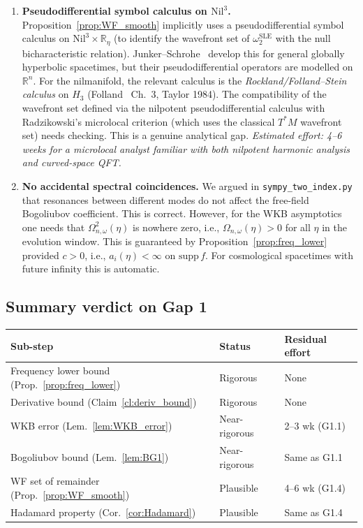 \documentclass[11pt, a4paper]{article}
\newcommand{\RR}{\mathbb{R}}
\newcommand{\Nil}{\mathrm{Nil}^3}
\newcommand{\om}{\omega}
\begin{document}
\begin{enumerate}[label=G1.\arabic*]
\item \label{gap:pseudodiff_nilmanifold}
  \textbf{Pseudodifferential symbol calculus on $\Nil$.}
  Proposition~\ref{prop:WF_smooth} implicitly uses a pseudodifferential
  symbol calculus on $\Nil \times \RR_\eta$ (to identify the
  wavefront set of $\omega_2^{\mathrm{SLE}}$ with the null bicharacteristic
  relation).
  Junker--Schrohe~\cite{JS02} develop this for general globally hyperbolic
  spacetimes, but their pseudodifferential operators are modelled on
  $\RR^n$.
  For the nilmanifold, the relevant calculus is the
  \emph{Rockland/Folland--Stein calculus} on $H_3$
  (Folland~\cite{Folland1989} Ch.~3, Taylor 1984).
  The compatibility of the wavefront set defined via the nilpotent
  pseudodifferential calculus with Radzikowski's microlocal criterion
  (which uses the classical $T^*M$ wavefront set) needs checking.
  This is a genuine analytical gap.
  \emph{Estimated effort: 4--6 weeks for a microlocal analyst familiar
  with both nilpotent harmonic analysis and curved-space QFT.}

\item \label{gap:no_resonances_ineq}
  \textbf{No accidental spectral coincidences.}
  We argued in \texttt{sympy\_two\_index.py} that resonances between
  different modes do not affect the free-field Bogoliubov coefficient.
  This is correct.
  However, for the WKB asymptotics one needs that
  $\Omega_{n,\om}^2(\eta)$ is nowhere zero, i.e.,
  $\Omega_{n,\om}(\eta) > 0$ for all $\eta$ in the evolution window.
  This is guaranteed by Proposition~\ref{prop:freq_lower} provided
  $c > 0$, i.e., $a_i(\eta) < \infty$ on $\mathrm{supp}\,f$.
  For cosmological spacetimes with future infinity this is automatic.

\end{enumerate}

\subsection{Summary verdict on Gap 1}

\begin{center}
\begin{tabular}{lll}
\hline
Sub-step & Status & Residual effort \\
\hline
Frequency lower bound (Prop.~\ref{prop:freq_lower}) & Rigorous & None \\
Derivative bound (Claim~\ref{cl:deriv_bound}) & Rigorous & None \\
WKB error (Lem.~\ref{lem:WKB_error}) & Near-rigorous & 2--3 wk (G1.1) \\
Bogoliubov bound (Lem.~\ref{lem:BG1}) & Near-rigorous & Same as G1.1 \\
WF set of remainder (Prop.~\ref{prop:WF_smooth}) & Plausible & 4--6 wk (G1.4) \\
Hadamard property (Cor.~\ref{cor:Hadamard}) & Plausible & Same as G1.4 \\
\hline
\end{tabular}
\end{center}
\end{document}

